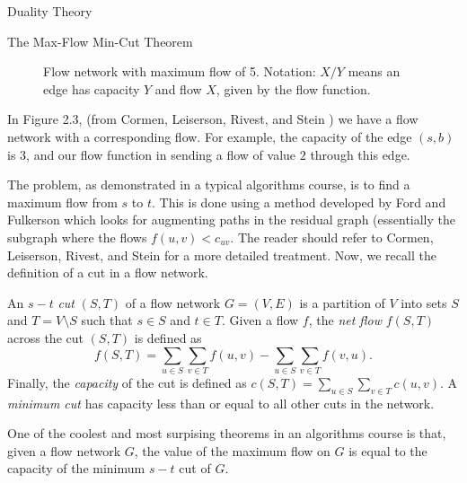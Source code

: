 \begin{section}{Duality Theory}
\begin{subsection}{The Max-Flow Min-Cut Theorem}
\begin{figure}[h]
		\caption{Flow network with maximum flow of 5. Notation: $X/Y$ means an edge has capacity 
		$Y$ and flow $X$, given by the flow function.}
	\end{figure}
	In Figure 2.3, (from Cormen, Leiserson, Rivest, and Stein \cite{cormen2009introduction}) 
	we have a flow network with a corresponding flow. For example, the capacity 
	of the edge $(s,b)$ is $3$, and our flow function in sending a flow of value $2$ through 
	this edge.

	The problem, as demonstrated in a typical algorithms course, is to find a maximum flow from $s$ 
	to $t$. This is done using a method developed by Ford and Fulkerson which looks for augmenting 
	paths in the residual graph (essentially the subgraph where the flows $f(u,v) < c_{uv}$. 
	The reader should refer to Cormen, Leiserson, Rivest, and Stein 
	\cite{cormen2009introduction} for a more detailed treatment. Now, we recall the definition 
	of a cut in a flow network.
	\begin{definition}
		An $s-t$ \emph{cut} $(S,T)$ of a flow network $G=(V,E)$ is a partition of $V$ into 
		sets $S$ and $T = V\setminus S$ such that $s\in S$ and $t\in T$. Given a flow $f$, the 
		\emph{net flow} $f(S,T)$ across the cut $(S,T)$ is defined as 
		\[
			f(S,T) = \sum_{u\in S} \sum_{v\in T} f(u,v) - \sum_{u\in S} \sum_{v\in T} 
			f(v,u).
		\]
		Finally, the \emph{capacity} of the cut is defined as $c(S,T) = 
		\sum_{u\in S} \sum_{v\in T} c(u,v)$. A \emph{minimum cut} has capacity less than or 
		equal to all other cuts in the network.
	\end{definition}
	One of the coolest and most surpising theorems in an algorithms course is that, given a flow 
	network $G$, the value of the maximum flow on $G$ is equal to the capacity of the minimum 
	$s-t$ cut of $G$.


\end{subsection}
\end{section}
